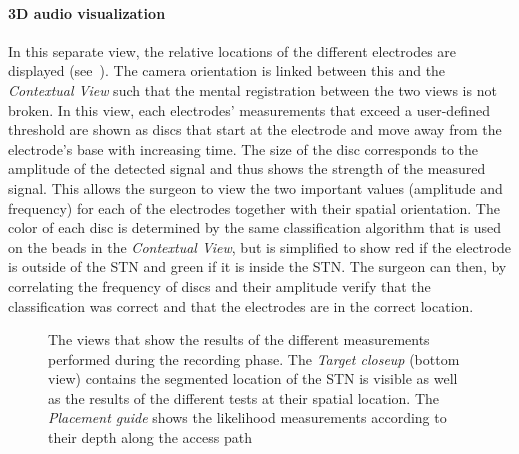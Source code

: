 \paragraph{3D audio visualization} In this separate view, the relative locations of the different electrodes are displayed (see~). The camera orientation is linked between this and the \emph{Contextual View} such that the mental registration between the two views is not broken. In this view, each electrodes' measurements that exceed a user-defined threshold are shown as discs that start at the electrode and move away from the electrode's base with increasing time. The size of the disc corresponds to the amplitude of the detected signal and thus shows the strength of the measured signal. This allows the surgeon to view the two important values (amplitude and frequency) for each of the electrodes together with their spatial orientation. The color of each disc is determined by the same classification algorithm that is used on the beads in the \emph{Contextual View}, but is simplified to show red if the electrode is outside of the STN and green if it is inside the STN. The surgeon can then, by correlating the frequency of discs and their amplitude verify that the classification was correct and that the electrodes are in the correct location.

\begin{figure}
\caption{The views that show the results of the different measurements performed during the recording phase. The \emph{Target closeup} (bottom view) contains the segmented location of the STN is visible as well as the results of the different tests at their spatial location. The \emph{Placement guide} shows the likelihood measurements according to their depth along the access path}
\label{contributions:medbio:dbs:target}
\end{figure}

